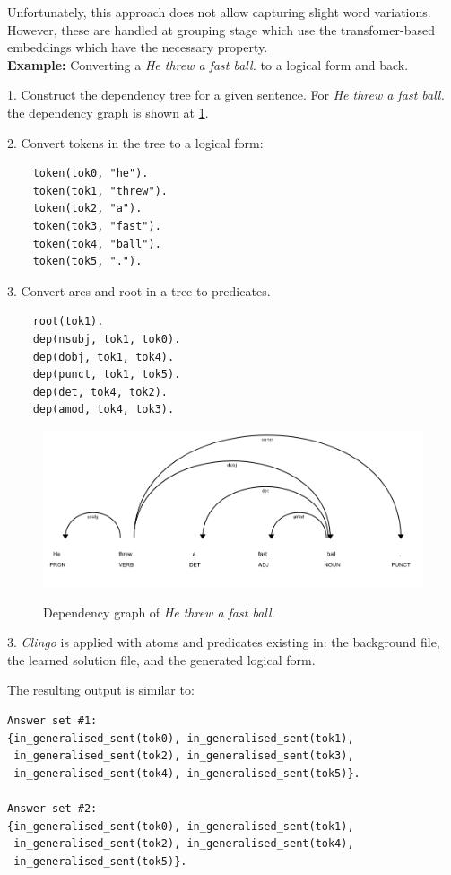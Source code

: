 Unfortunately, this approach does not allow capturing slight word variations.
However, these are handled at grouping stage which use the transfomer-based embeddings which have the necessary property. \\




\textbf{Example:} Converting a \emph{He threw a fast ball.} to a logical form and back.


1. Construct the dependency tree for a given sentence. For \emph{He threw a fast ball.} the dependency graph is shown at \ref{example-dependency-graph}.

2. Convert tokens in the tree to a logical form:

\begin{verbatim}
    token(tok0, "he").
    token(tok1, "threw").
    token(tok2, "a").
    token(tok3, "fast").
    token(tok4, "ball").
    token(tok5, ".").
\end{verbatim}

3. Convert arcs and root in a tree to predicates.
\begin{verbatim}
    root(tok1).
    dep(nsubj, tok1, tok0).
    dep(dobj, tok1, tok4).
    dep(punct, tok1, tok5).
    dep(det, tok4, tok2).
    dep(amod, tok4, tok3).
\end{verbatim}


\begin{figure}[h]
\caption{Dependency graph of \emph{He threw a fast ball.}}
\centering
\includegraphics[width=\textwidth]{project-work/example_dependency_tree.png}
\label{example-dependency-graph}
\end{figure}

3. \textit{Clingo} is applied with atoms and predicates existing in: the background file, the learned solution file, and the generated logical form.

The resulting output is similar to:
\begin{verbatim}
Answer set #1:
{in_generalised_sent(tok0), in_generalised_sent(tok1), 
 in_generalised_sent(tok2), in_generalised_sent(tok3), 
 in_generalised_sent(tok4), in_generalised_sent(tok5)}.
    
Answer set #2:
{in_generalised_sent(tok0), in_generalised_sent(tok1), 
 in_generalised_sent(tok2), in_generalised_sent(tok4), 
 in_generalised_sent(tok5)}.
\end{verbatim}

